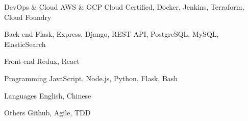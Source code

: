 

\begin{cvskills}

  \cvskill
    {DevOps \& Cloud} %
    {AWS \& GCP Cloud Certified, Docker, Jenkins, Terraform, Cloud Foundry} %

  \cvskill
    {Back-end} %
    {Flask, Express, Django, REST API, PostgreSQL, MySQL, ElasticSearch} %

  \cvskill
    {Front-end} %
    {Redux, React} %

  \cvskill
    {Programming} %
    {JavaScript, Node.js, Python, Flask, Bash} %

  \cvskill
    {Languages} %
    {English, Chinese} %

  \cvskill
    {Others} %
    {Github, Agile, TDD} %


\end{cvskills}
